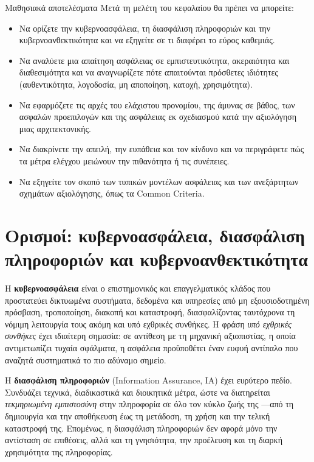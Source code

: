 \documentclass[11pt,openany]{book}
\begin{document}
\begin{outcomesbox}{Μαθησιακά αποτελέσματα}
Μετά τη μελέτη του κεφαλαίου θα πρέπει να μπορείτε:
\begin{itemize}
  \item Να ορίζετε την κυβερνοασφάλεια, τη διασφάλιση πληροφοριών και την κυβερνοανθεκτικότητα και να εξηγείτε σε τι διαφέρει το εύρος καθεμιάς.
  \item Να αναλύετε μια απαίτηση ασφάλειας σε εμπιστευτικότητα, ακεραιότητα και διαθεσιμότητα και να αναγνωρίζετε πότε απαιτούνται πρόσθετες ιδιότητες (αυθεντικότητα, λογοδοσία, μη αποποίηση, κατοχή, χρησιμότητα).
  \item Να εφαρμόζετε τις αρχές του ελάχιστου προνομίου, της άμυνας σε βάθος, των ασφαλών προεπιλογών και της ασφάλειας εκ σχεδιασμού κατά την αξιολόγηση μιας αρχιτεκτονικής.
  \item Να διακρίνετε την απειλή, την ευπάθεια και τον κίνδυνο και να περιγράφετε πώς τα μέτρα ελέγχου μειώνουν την πιθανότητα ή τις συνέπειες.
  \item Να εξηγείτε τον σκοπό των τυπικών μοντέλων ασφάλειας και των ανεξάρτητων σχημάτων αξιολόγησης, όπως τα Common Criteria.
\end{itemize}
\end{outcomesbox}

\section{Ορισμοί: κυβερνοασφάλεια, διασφάλιση πληροφοριών και κυβερνοανθεκτικότητα}\label{sec:1.1}
Η \textbf{κυβερνοασφάλεια} είναι ο επιστημονικός και επαγγελματικός κλάδος που προστατεύει δικτυωμένα συστήματα, δεδομένα και υπηρεσίες από μη εξουσιοδοτημένη πρόσβαση, τροποποίηση, διακοπή και καταστροφή, διασφαλίζοντας ταυτόχρονα τη νόμιμη λειτουργία τους ακόμη και υπό εχθρικές συνθήκες. Η φράση \emph{υπό εχθρικές συνθήκες} έχει ιδιαίτερη σημασία: σε αντίθεση με τη μηχανική αξιοπιστίας, η οποία αντιμετωπίζει τυχαία σφάλματα, η ασφάλεια προϋποθέτει έναν ευφυή αντίπαλο που αναζητά συστηματικά το πιο αδύναμο σημείο.

Η \textbf{διασφάλιση πληροφοριών} (Information Assurance, IA) έχει ευρύτερο πεδίο. Συνδυάζει τεχνικά, διαδικαστικά και διοικητικά μέτρα, ώστε να διατηρείται \emph{τεκμηριωμένη εμπιστοσύνη} στην πληροφορία σε όλο τον κύκλο ζωής της —από τη δημιουργία και την αποθήκευση έως τη μετάδοση, τη χρήση και την τελική καταστροφή της. Επομένως, η διασφάλιση πληροφοριών δεν αφορά μόνο την αντίσταση σε επιθέσεις, αλλά και τη γνησιότητα, την προέλευση και τη διαρκή χρησιμότητα της πληροφορίας.
\end{document}
